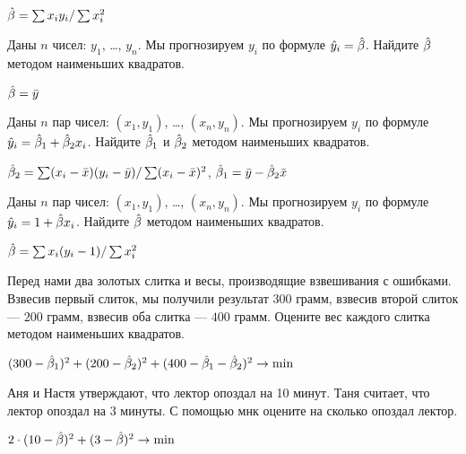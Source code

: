 \documentclass[pdftex,11pt,openany]{book}
\begin{document}
\begin{solution}
$\hat{\beta}=\sum x_i y_i/\sum x_i^2$
\end{solution}

\begin{problem}
Даны $n$ чисел: $y_1$, \ldots, $y_n$. Мы прогнозируем $y_i$ по формуле $\hat{y}_i=\hat{\beta}$. Найдите $\hat{\beta}$ методом наименьших квадратов. 
\end{problem}
\begin{solution}
$\hat{\beta}=\bar{y}$
\end{solution}

\begin{problem}
Даны $n$ пар чисел: $(x_1, y_1)$, \ldots, $(x_n,y_n)$. Мы прогнозируем $y_i$ по формуле $\hat{y}_i=\hat{\beta}_1+\hat{\beta}_2 x_i$. Найдите $\hat{\beta}_1$ и $\hat{\beta}_2$ методом наименьших квадратов. 
\end{problem}
\begin{solution}
$\hat{\beta}_2=\sum (x_i-\bar{x})(y_i-\bar{y})/\sum(x_i-\bar{x})^2$, $\hat{\beta}_1=\bar{y}-\hat{\beta}_2\bar{x}$
\end{solution}

\begin{problem}
Даны $n$ пар чисел: $(x_1, y_1)$, \ldots, $(x_n,y_n)$. Мы прогнозируем $y_i$ по формуле $\hat{y}_i=1+\hat{\beta} x_i$. Найдите $\hat{\beta}$ методом наименьших квадратов. 
\end{problem}
\begin{solution}
$\hat{\beta}=\sum x_i (y_i-1)/\sum x_i^2$
\end{solution}

\begin{problem}
 Перед нами два золотых слитка и весы, производящие взвешивания с ошибками. Взвесив первый слиток, мы получили результат $300$ грамм, взвесив второй слиток --- $200$ грамм, взвесив оба слитка --- $400$ грамм. Оцените вес каждого слитка методом наименьших квадратов.
 \end{problem}
\begin{solution}
 $(300-\hat{\beta}_1)^2+(200-\hat{\beta}_2)^2+(400-\hat{\beta}_1-\hat{\beta}_2)^2\rightarrow\min$ 
\end{solution}


\begin{problem}
 Аня и Настя утверждают, что лектор опоздал на 10 минут. Таня считает, что лектор опоздал на 3 минуты. С помощью мнк оцените на сколько опоздал лектор. 
\end{problem}
\begin{solution}
 $2\cdot (10-\hat{\beta})^2+(3-\hat{\beta})^2\rightarrow\min$ 
\end{solution}
\end{document}

